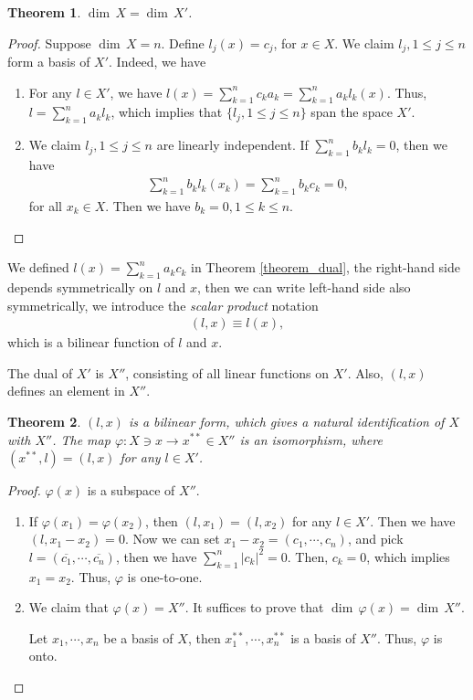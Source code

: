 \documentclass[11pt]{book}
\newtheorem{theorem}{Theorem}[chapter]
\theoremstyle{definition}
\numberwithin{equation}{chapter}
\begin{document}
\begin{theorem}
$ \dim \,X =  \dim \,X'$.
\end{theorem}
\begin{proof}
Suppose $ \dim \,X = n$. Define $l_j(x) = c_j$, for $x\in X$. We claim $l_j, 1\leq j\leq n$ form a basis of $X'$. Indeed, we have
\begin{enumerate}[label=(\alph*)]
    \item For any $l\in X'$, we have $l(x) = \sum^n_{k=1}c_k a_k = \sum^n_{k=1}a_k l_k(x)$. Thus, $l = \sum^n_{k=1}a_k l_k$, which implies that $\{l_j, 1\leq j\leq n\}$ span the space $X'$.
    \item We claim $l_j, 1\leq j\leq n$ are linearly independent. If $\sum^n_{k=1}b_k l_k = 0$, then we have 
    \begin{align*}
        \sum^n_{k=1}b_k l_k(x_k) = \sum^n_{k=1}b_k c_k = 0,
    \end{align*}
    for all $x_k\in X$. Then we have $b_k = 0, 1\leq k \leq n$.
\end{enumerate}
\end{proof}

\medskip

We defined $l(x) = \sum^n_{k=1} a_k c_k$ in Theorem \ref{theorem_dual}, the right-hand side depends symmetrically on $l$ and $x$, then we can write left-hand side also symmetrically, we introduce the \emph{scalar product} notation
\begin{align*}
    (l,x) \equiv l(x),
\end{align*}
which is a bilinear function of $l$ and $x$. 

The dual of $X'$ is $X''$, consisting of all linear functions on $X'$. Also, $(l,x)$ defines an element in $X''$.

\begin{theorem}\label{dual_identification_theorem}
$(l,x)$ is a bilinear form, which gives a natural identification of $X$ with $X''$. The map $\varphi:X\ni x \to x^{**}\in X''$ is an isomorphism, where $(x^{**},l) = (l,x)$ for any $l\in X'$.
\end{theorem}
\begin{proof}
$\varphi(x)$ is a subspace of $X''$.
\begin{enumerate}[label=(\alph*)]
    \item If $\varphi(x_1) = \varphi(x_2)$, then $(l,x_1) = (l,x_2)$ for any $l\in X'$. Then we have $(l,x_1 - x_2) = 0$. Now we can set $x_1 - x_2 = (c_1,\cdots,c_n)$, and pick $l = (\overline{c_1},\cdots,\overline{c_n})$, then we have $\sum^n_{k=1}|c_k|^2 = 0$. Then, $c_k = 0$, which implies $x_1 = x_2$. Thus, $\varphi$ is one-to-one.
    
    \item We claim that $\varphi(x) = X''$. It suffices to prove that $ \dim \,\varphi(x) =  \dim \,X''$.
    
    Let $x_1,\cdots,x_n$ be a basis of $X$, then $x_1^{**},\cdots,x_n^{**}$ is a basis of $X''$. Thus, $\varphi$ is onto.
\end{enumerate}
\end{proof}
\end{document}
